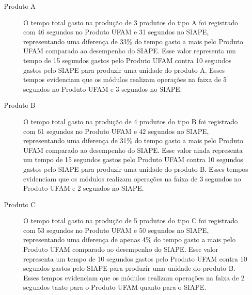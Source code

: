 \begin{description}
	\item[Produto A] O tempo total gasto na produção de 3 produtos do tipo A foi registrado com 46 segundos no Produto UFAM e 31 segundos no SIAPE, representando uma diferença de 33\% do tempo gasto a mais pelo Produto UFAM comparado ao desempenho do  SIAPE. Esse valor representa um tempo de 15 segundos gastos pelo Produto UFAM contra 10 segundos gastos pelo SIAPE para produzir uma unidade do produto A. Esses tempos evidenciam que os módulos realizam operações na faixa de 5 segundos no Produto UFAM e 3 segundos no SIAPE. 	
	
	\item[Produto B] O tempo total gasto na produção de 4 produtos do tipo B foi registrado com 61 segundos no Produto UFAM e 42 segundos no SIAPE, representando uma diferença de 31\% do tempo gasto a mais pelo Produto UFAM comparado ao desempenho do  SIAPE. Esse valor ainda representa um tempo de 15 segundos gastos pelo Produto UFAM contra 10 segundos gastos pelo SIAPE para produzir uma unidade do produto B. Esses tempos evidenciam que os módulos realizam operações na faixa de 3 segundos no Produto UFAM e 2 segundos no SIAPE. 	
		
	\item[Produto C] O tempo total gasto na produção de 5 produtos do tipo C foi registrado com 53  segundos no Produto UFAM e 50 segundos no SIAPE, representando uma diferença de apenas 4\% do tempo gasto a mais pelo Produto UFAM comparado ao desempenho do  SIAPE. Esse valor representa um tempo de 10 segundos gastos pelo Produto UFAM contra 10 segundos gastos pelo SIAPE para produzir uma unidade do produto B. Esses tempos evidenciam que os módulos realizam operações na faixa de 2 segundos tanto para o Produto UFAM quanto para o SIAPE. 
		
\end{description} 	 	 
 
